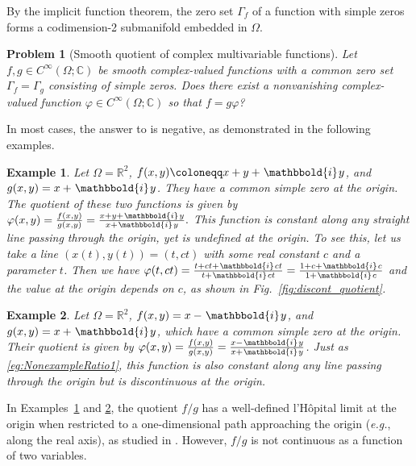 \documentclass{article}
\newcommand{\Albert}[1]{{\color[rgb]{0.2,0.4,0.8}\textbf{Albert: } #1}}
\theoremstyle{theorem}
\newtheorem{problem}{Problem}
\newtheorem{example}{Example}
\theoremstyle{definition}
\newcommand{\figref}[1]{\textup{Fig.~\ref{#1}}}
\def\eg{\emph{e.g.}}
\def\CC{\mathbb{C}}
\def\RR{\mathbb{R}}
\newcommand{\ii}{\mkern1.5mu\mathbbold{i}\mkern1.5mu}
\begin{document}
By the implicit function theorem, the zero set \(\Gamma_f\) of a function with simple zeros forms a codimension-2 submanifold embedded in \(\Omega\).

\begin{problem}[Smooth quotient of complex multivariable functions]\label{prob:ComplexLHopital}
Let \(f,g\in C^\infty(\Omega;\CC)\) be smooth complex-valued functions with a common zero set \(\Gamma_f = \Gamma_g\) consisting of simple zeros.  Does there exist a nonvanishing complex-valued function \(\varphi\in C^\infty(\Omega;\CC)\) so that \(f = g\varphi\)?
\end{problem}
In most cases, the answer to  is negative, as demonstrated in the following examples.
\begin{example}\label{eg:NonexampleRatio1}
    Let \(\Omega=\RR^2\), \(f(x,y)\coloneqq x+y+\ii y\), and \(g(x,y) = x + \ii y\).  They have a common simple zero at the origin.  The quotient of these two functions is given by
    \(
    \varphi(x,y) = \frac{f(x,y)}{g(x,y)} = \frac{x+y+\ii y}{x+\ii y}. 
    \)
    This function is constant along any straight line passing through the origin, yet is undefined at the origin. To see this, let us take a line $(x(t),y(t))=(t,ct)$ with some real constant $c$ and a parameter $t$. Then we have \(\varphi(t,ct)=\frac{t+ct+\ii ct}{t+\ii ct}=\frac{1+c+\ii c}{1+\ii c}\) and the value at the origin depends on $c$, as shown in \figref{fig:discont_quotient}.
\end{example}
\begin{example}\label{eg:NonexampleRatio2}
    Let \(\Omega = \RR^2\), \(f(x,y) = x-\ii y\), and \(g(x,y) = x+\ii y\), which have a common simple zero at the origin.  Their quotient is given by \(\varphi(x,y) = \frac{f(x,y)}{g(x,y)} = \frac{x-\ii y}{x+\ii y}\). Just as \autoref{eg:NonexampleRatio1},  this function is also constant along any line passing through the origin but is discontinuous at the origin.
\end{example}

In Examples~\ref{eg:NonexampleRatio1} and \ref{eg:NonexampleRatio2}, the quotient \(f/g\) has a well-defined l'H\^opital limit at the origin when restricted to a one-dimensional path approaching the origin (\eg, along the real axis), as studied in \cite{Carter:1958:HRC}.  However, \(f/g\) is not continuous as a function of two variables.
\end{document}
